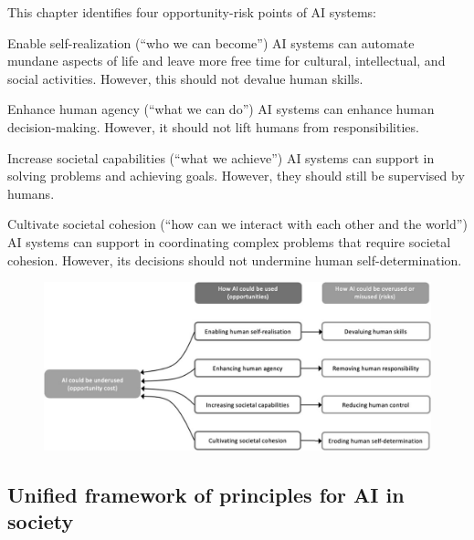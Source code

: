 This chapter identifies four opportunity-risk points of AI systems:
\begin{descriptionlist}
    \item[Enable self-realization]  (``who we can become'')
        AI systems can automate mundane aspects of life and leave more free time for cultural, intellectual, and social activities. However, this should not devalue human skills.

    \item[Enhance human agency]  (``what we can do'')
        AI systems can enhance human decision-making. However, it should not lift humans from responsibilities.

    \item[Increase societal capabilities]  (``what we achieve'')
        AI systems can support in solving problems and achieving goals. However, they should still be supervised by humans.

    \item[Cultivate societal cohesion]  (``how can we interact with each other and the world'')
        AI systems can support in coordinating complex problems that require societal cohesion. However, its decisions should not undermine human self-determination.
\end{descriptionlist}

\begin{figure}[H]
    \centering
    \includegraphics[width=0.65\linewidth]{./img/ai4people_opportunities_risks.png}
\end{figure}


\subsection{Unified framework of principles for AI in society}

